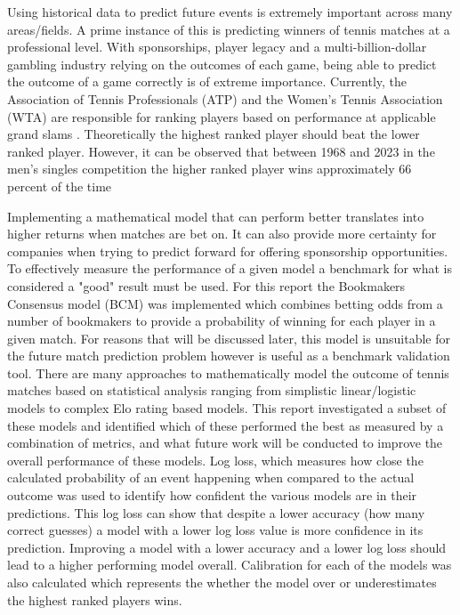 \documentclass[12pt,a4paper]{article}
\begin{document}
Using historical data to predict future events is extremely important across many
areas/fields. A prime instance of this is predicting winners of tennis matches at
a professional level. With sponsorships, player legacy and a multi-billion-dollar
gambling industry relying on the outcomes of each game, being able to predict the
outcome of a game correctly is of extreme importance. Currently, the
Association of Tennis Professionals (ATP) and the Women's Tennis Association
(WTA) are responsible for ranking players based on performance at applicable
grand slams \cite{nag_tennis_2022}.  Theoretically the highest ranked player should beat
the lower ranked player. However, it can be observed that between 1968 and 2023
in the men's singles competition the higher ranked player wins approximately 66
percent of the time

Implementing a mathematical model that can perform better translates into higher
returns when matches are bet on. It can also provide more certainty for companies
when trying to
predict forward for offering sponsorship opportunities. To effectively measure
the performance of a given model a benchmark for what is considered a "good" result
must be used. For this report the Bookmakers Consensus model (BCM) was implemented which
combines betting odds from a number of bookmakers to provide a probability of winning
for each player in a given match. For reasons that will be discussed later, this
model is unsuitable for the future match prediction problem however is useful as a
benchmark validation tool.
There are many approaches to mathematically model the outcome of tennis matches based on statistical analysis
ranging from simplistic linear/logistic models to complex Elo rating based models.
This report investigated a subset of these models and identified
which of these performed the best as measured by a combination of metrics,
and what future work will be conducted to
improve the overall performance of these models. Log loss, which measures how close
the calculated probability
of an event happening when compared to the actual outcome was used to identify
how confident the various models are in their predictions. This log loss can show
that despite a lower accuracy (how many correct guesses) a model with a lower
log loss value is more confidence in its prediction. Improving a model with a lower
accuracy and a lower log loss should lead to a higher performing model overall.
Calibration for each of the models was also calculated which represents the whether
the model over or underestimates the highest ranked players wins.
\noindent \hrulefill
\end{document}
